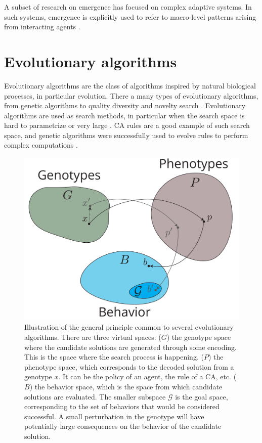 A subset of research on emergence has focused on complex adaptive systems. In
such systems, emergence is explicitly used to refer to macro-level patterns
arising from interacting agents \parencite{hollandEmergenceChaosOrder2000,
  kauffmanHomeUniverseSearch1995, langtonStudyingArtificialLife1986}.


\section{Evolutionary algorithms}\label{sec:evol-algor}
Evolutionary algorithms are the class of algorithms inspired by natural
biological processes, in particular evolution. There a many types of
evolutionary algorithms, from genetic algorithms to quality diversity and
novelty search \parencite{lehmanAbandoningObjectivesEvolution2011,
  lehmanEvolvingDiversityVirtual2011}. Evolutionary algorithms are used as
search methods, in particular when the search space is hard to parametrize or
very large \parencite{poliRelationsSearchEvolutionary1996}. \ac{CA} rules are a
good example of such search space, and genetic algorithms were successfully used
to evolve rules to perform complex computations
\parencite{mitchellEvolvingCellularAutomata1996}.

\begin{figure}[htbp]
  \centering
  \includegraphics[width=.8\linewidth]{figures/evolutionary_diagram.pdf}
  \caption{Illustration of the general principle common to several evolutionary
    algorithms. There are three virtual spaces: ($G$) the genotype space where
    the candidate solutions are generated through some encoding. This is the
    space where the search process is happening. ($P$) the phenotype space,
    which corresponds to the decoded solution from a genotype $x$. It can be the
    policy of an agent, the rule of a \ac{CA}, etc. ($B$) the behavior space,
    which is the space from which candidate solutions are evaluated. The smaller
    subspace $\mathcal{G}$ is the goal space, corresponding to the set of
    behaviors that would be considered successful. A small perturbation in the
    genotype will have potentially large consequences on the behavior of the
    candidate solution.}
  \label{fig:evolutionary_diagram}
\end{figure}

